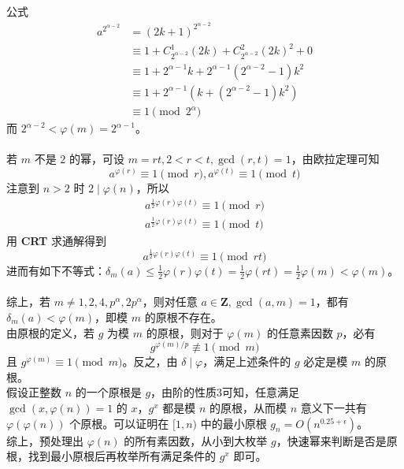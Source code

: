 \documentclass[12pt,a4paper]{article}
\begin{document}
公式
\begin{align*}
	a^{2^{\alpha-2}}
	&=(2k+1)^{2^{\alpha-2}}\\
	&\equiv1+C_{2^{\alpha-2}}^1(2k)+C_{2^{\alpha-2}}^{2}(2k)^2+0\\
	&\equiv1+2^{\alpha-1}k+2^{\alpha-1}(2^{\alpha-2}-1)k^2\\
	&\equiv 1+2^{\alpha-1}(k+(2^{\alpha-2}-1)k^2)\\
	&\equiv 1 \pmod {2^{\alpha}}
\end{align*}
而 $2^{\alpha-2}<\varphi(m)=2^{\alpha-1}$。\\\\
若 $m$ 不是 $2$ 的幂，可设 $m=rt,2<r<t,\gcd(r,t)=1$，由欧拉定理可知 
\begin{equation*}
	a^{\varphi(r)}\equiv1\pmod r,a^{\varphi(t)}\equiv1\pmod t
\end{equation*}
注意到 $n>2$ 时 $2\mid\varphi(n)$，所以 
\begin{align*}
	\displaystyle a^{\frac{1}{2}\varphi(r)\varphi(t)}\equiv1\pmod{r}\\
	a^{\frac{1}{2}\varphi(r)\varphi(t)}\equiv1\pmod{t}
\end{align*}
用 \textbf{CRT} 求通解得到 
\begin{equation*}
	\displaystyle a^{\frac{1}{2}\varphi(r)\varphi(t)}\equiv1\pmod{rt}
\end{equation*}
进而有如下不等式：$\displaystyle\delta_m(a)\le\frac{1}{2}\varphi(r)\varphi(t)=\frac{1}{2}\varphi(rt)=\frac{1}{2}\varphi(m)<\varphi(m)$。\\\\
综上，若 $m\neq 1,2,4,p^\alpha,2p^\alpha$，则对任意 $a\in\mathbf{Z},\gcd(a,m)=1$，都有 $\delta_m(a)<\varphi(m)$，即模 $m$ 的原根不存在。\\
由原根的定义，若 $g$ 为模 $m$ 的原根，则对于 $\varphi(m)$ 的任意素因数 $p$，必有 
\begin{equation*}
	g^{\varphi(m)/p}\not\equiv1\pmod{m}
\end{equation*}
且 $g^{\varphi(m)}\equiv1\pmod m$。反之，由 $\delta\mid\varphi$，满足上述条件的 $g$ 必定是模 $m$ 的原根。\\
假设正整数 $n$ 的一个原根是 $g$，由阶的性质3可知，任意满足 $\gcd(x,\varphi(n))=1$ 的 $x$，$g^x$ 都是模 $n$ 的原根，从而模 $n$ 意义下一共有 $\varphi(\varphi(n))$ 个原根。可以证明在 $[1,n)$ 中的最小原根 $g_n=O(n^{0.25+\epsilon})$。\\
综上，预处理出 $\varphi(n)$ 的所有素因数，从小到大枚举 $g$，快速幂来判断是否是原根，找到最小原根后再枚举所有满足条件的 $g^x$ 即可。
\end{document}
